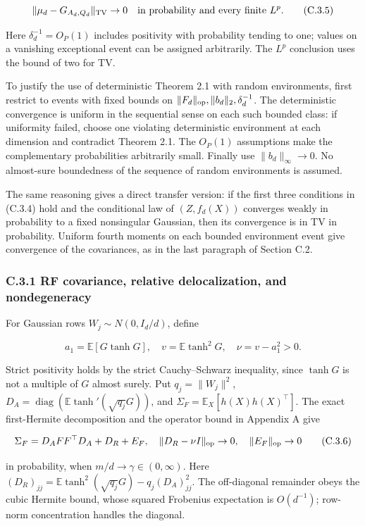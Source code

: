 \documentclass[
  11pt,
  a4paper,
]{article}
\begin{document}
\[
\|\mu_d-G_{A_d,Q_d}\|_{\rm TV}\to0
\quad\text{in probability and every finite }L^p.
\tag{C.3.5}
\]

Here \(\delta_d^{-1}=O_P(1)\) includes positivity with probability
tending to one; values on a vanishing exceptional event can be assigned
arbitrarily. The \(L^p\) conclusion uses the bound of two for TV.

To justify the use of deterministic Theorem 2.1 with random
environments, first restrict to events with fixed bounds on
\(\|F_d\|_{\rm op},\|b_d\|_2,\delta_d^{-1}\). The deterministic
convergence is uniform in the sequential sense on each such bounded
class: if uniformity failed, choose one violating deterministic
environment at each dimension and contradict Theorem 2.1. The \(O_P(1)\)
assumptions make the complementary probabilities arbitrarily small.
Finally use \(\|b_d\|_\infty\to0\). No almost-sure boundedness of the
sequence of random environments is assumed.

The same reasoning gives a direct transfer version: if the first three
conditions in (C.3.4) hold and the conditional law of \((Z,f_d(X))\)
converges weakly in probability to a fixed nonsingular Gaussian, then
its convergence is in TV in probability. Uniform fourth moments on each
bounded environment event give convergence of the covariances, as in the
last paragraph of Section C.2.

\hypertarget{c.3.1-rf-covariance-relative-delocalization-and-nondegeneracy}{%
\subsubsection{C.3.1 RF covariance, relative delocalization, and
nondegeneracy}\label{c.3.1-rf-covariance-relative-delocalization-and-nondegeneracy}}

For Gaussian rows \(W_j\sim N(0,I_d/d)\), define

\[
a_1=\mathbb E[G\tanh G],\quad v=\mathbb E\tanh^2G,
\quad\nu=v-a_1^2>0.
\]

Strict positivity holds by the strict Cauchy--Schwarz inequality, since
\(\tanh G\) is not a multiple of \(G\) almost surely. Put
\(q_j=\|W_j\|^2\),
\(D_A=\operatorname{diag}(\mathbb E\tanh'(\sqrt{q_j}G))\), and
\(\Sigma_F=\mathbb E_X[h(X)h(X)^\top]\). The exact first-Hermite
decomposition and the operator bound in Appendix A give

\[
\Sigma_F=D_AFF^\top D_A+D_R+E_F,
\quad \|D_R-\nu I\|_{\rm op}\to0,
\quad\|E_F\|_{\rm op}\to0
\tag{C.3.6}
\]

in probability, when \(m/d\to\gamma\in(0,\infty)\). Here
\((D_R)_{jj}=\mathbb E\tanh^2(\sqrt{q_j}G)-q_j(D_A)_{jj}^2\). The
off-diagonal remainder obeys the cubic Hermite bound, whose squared
Frobenius expectation is \(O(d^{-1})\); row-norm concentration handles
the diagonal.
\end{document}
